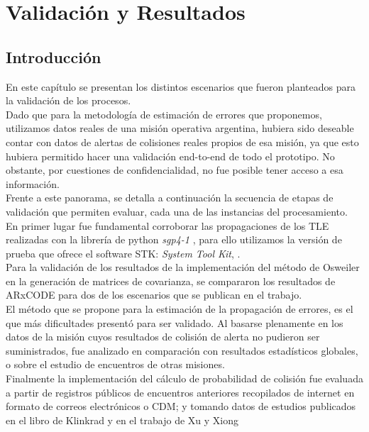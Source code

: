 \chapter{Validaci\'on y Resultados}
\label{chap:resultados}


\section{Introducci\'on}
En este cap\'itulo se presentan los distintos escenarios que fueron planteados para la validaci\'on de los procesos.\\
Dado que para la metodolog\'ia de estimaci\'on de errores que proponemos, utilizamos datos reales de una misi\'on operativa argentina, hubiera sido
deseable contar con datos de alertas de colisiones reales propios de esa misi\'on, ya que esto hubiera permitido hacer una validaci\'on end-to-end de todo el prototipo. No obstante, por cuestiones de confidencialidad, no fue posible tener acceso a esa informaci\'on.\\
Frente a este panorama, se detalla a continuaci\'on la secuencia de etapas de validaci\'on que permiten evaluar, cada una de las instancias del procesamiento.\\

En primer lugar fue fundamental corroborar las propagaciones de los TLE realizadas con la librer\'ia de python {\it{sgp4-1}} \citep{sgp4python}, para ello utilizamos la versi\'on de prueba que ofrece el software STK: {\it{System Tool Kit}}, \citep{stk}.\\
Para la validaci\'on de los resultados de la implementaci\'on del m\'etodo de Osweiler en la generaci\'on de matrices de covarianza, se compararon los resultados de ARxCODE para dos de los escenarios que se publican en el trabajo.\\

El m\'etodo que se propone para la estimaci\'on de la propagaci\'on de errores, es el que m\'as dificultades present\'o para ser validado. Al basarse plenamente en los datos de la misi\'on cuyos resultados de colisi\'on de alerta no pudieron ser suministrados, fue analizado en comparaci\'on con resultados estad\'isticos globales, o sobre el estudio de encuentros de otras misiones.\\

Finalmente la implementaci\'on del c\'alculo de probabilidad de colisi\'on fue evaluada a partir de registros p\'ublicos de encuentros anteriores recopilados de internet en formato de correos electr\'onicos o CDM; y tomando datos de estudios publicados en el libro de Klinkrad \citep{Klinkrad} y en el trabajo de Xu y Xiong \citep{xu2014method}\\

